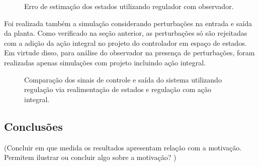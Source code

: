 \begin{figure}[!h]
    \caption{Erro de estimação dos estados utilizando regulador com observador.}
    \vspace{-10pt}
    \hspace{-30pt}
    \label{fig:erro-de-estimacao-de-estados-do-regulador-com-observador}
    \begin{minipage}{\linewidth}
        
    \end{minipage}
\end{figure}

Foi realizada também a simulação considerando perturbações na entrada e saída da
planta. Como verificado na seção anterior, as perturbações só são rejeitadas com
a adição da ação integral no projeto do controlador em espaço de estados. Em
virtude disso, para análise do observador na presença de perturbações, foram
realizadas apenas simulações com projeto incluindo ação integral.  

\begin{figure}[!h]
    \caption{Comparação dos sinais de controle e saída do sistema utilizando
    regulação via realimentação de estados e regulação com ação integral.}
    \vspace{-10pt}
    \hspace{-30pt}
    \label{fig:erro-de-estimacao-de-esta}
    \begin{minipage}{\linewidth}
        
    \end{minipage}
\end{figure}

\subsection{Conclusões}
(Concluir em que medida os resultados apresentam relação com a motivação.
Permitem ilustrar ou concluir algo sobre a motivação? )
